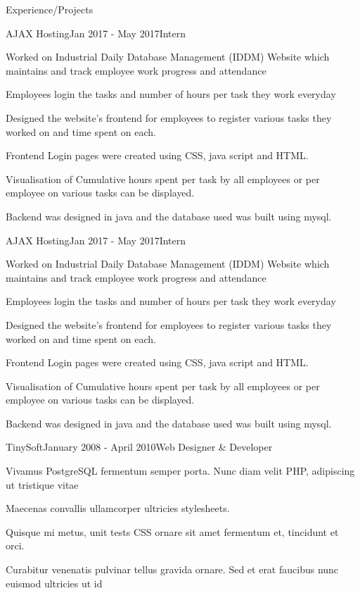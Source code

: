 \documentclass{resume}
\begin{document}
  \begin{rSection}{Experience/Projects}
  
    \begin{rSubsection}{AJAX Hosting}{Jan 2017 - May 2017}{Intern}
	\item Worked on Industrial Daily Database Management (IDDM) Website which maintains and track employee work progress and attendance
	\item Employees login the tasks and number of hours per task they work everyday
	\item Designed the website's frontend for employees to register various tasks they worked on and time spent on each.
	\item Frontend Login pages were created using CSS, java script and HTML.
	\item Visualisation of Cumulative hours spent per task by all employees or per employee on various tasks can be displayed.
	\item Backend was designed in java and the database used was built using mysql.
    \end{rSubsection}
  
    \begin{rSubsection}{AJAX Hosting}{Jan 2017 - May 2017}{Intern}
	\item Worked on Industrial Daily Database Management (IDDM) Website which maintains and track employee work progress and attendance
	\item Employees login the tasks and number of hours per task they work everyday
	\item Designed the website's frontend for employees to register various tasks they worked on and time spent on each.
	\item Frontend Login pages were created using CSS, java script and HTML.
	\item Visualisation of Cumulative hours spent per task by all employees or per employee on various tasks can be displayed.
	\item Backend was designed in java and the database used was built using mysql.
    \end{rSubsection}

    \begin{rSubsection}{TinySoft}{January 2008 - April 2010}{Web Designer \& Developer}
    \item Vivamus PostgreSQL fermentum semper porta. Nunc diam velit PHP, adipiscing ut tristique vitae
    \item Maecenas convallis ullamcorper ultricies stylesheets.
    \item Quisque mi metus, unit tests CSS ornare sit amet fermentum et, tincidunt et orci.
    \item Curabitur venenatis pulvinar tellus gravida ornare. Sed et erat faucibus nunc euismod ultricies ut id
    \end{rSubsection}
  
  \end{rSection}
  
\end{document}
